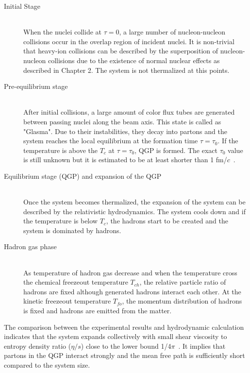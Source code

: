 \begin{description}
\item[Initial Stage] \mbox{}\\
When the nuclei collide at $\tau=$0, a large number of nucleon-nucleon collisions occur in the overlap region of incident nuclei. %
It is non-trivial that heavy-ion collisions can be described by the superposition of nucleon-nucleon collisions due to the existence of normal nuclear effects as described in Chapter 2.
The system is not thermalized at this points.

\item[Pre-equilibrium stage] \mbox{} \\
After initial collisions, a large amount of color flux tubes are generated between passing nuclei along the beam axis. 
This state is called as "Glasma".
Due to their instabilities, they decay into partons and the system reaches the local equilibrium at the formation time $\tau = \tau_{0}$. 
If the temperature is above the $T_{c}$ at $\tau=\tau_{0}$, QGP is formed. 
The exact $\tau_{0}$ value is still unknown but it is estimated to be at least shorter than 1 fm/$c$~\cite{bib_flow}.


\item[Equilibrium stage (QGP) and expansion of the QGP] \mbox{} \\
Once the system becomes thermalized, the expansion of the system can be described by the relativistic hydrodynamics. 
The system cools down and if the temperature is below $T_{c}$, the hadrons start to be created and the system is dominated by hadrons. 

\item[Hadron gas phase] \mbox{} \\
As temperature of hadron gas decrease and when the temperature cross the chemical freezeout temperature $T_{ch}$, the relative particle ratio of hadrons are fixed although generated hadrons interact each other. 
At the kinetic freezeout temperature $T_{fo}$, the momentum distribution of hadrons is fixed and hadrons are emitted from the matter.  
\end{description}
The comparison between the experimental results and hydrodynamic calculation indicates that the system expands collectively with small shear viscosity to entropy density ratio ($\eta /s$) close to the lower bound 1/4$\pi$~\cite{bib_flow}. 
It implies that partons in the QGP interact strongly and the mean free path is sufficiently short compared to the system size. 


